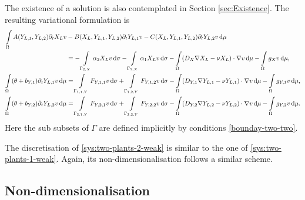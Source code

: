 \documentclass[11pt]{article}
\numberwithin{equation}{section}
\begin{document}
The existence of a solution is also contemplated in Section \ref{sec:Existence}.
The resulting variational formulation is 
\begin{subequations}
\label{sys:two-plants-2-weak}
\begin{align}
    \int\limits_\Omega
    A(Y_{L,1}, Y_{L,2}) \partial_t X_L v &- B(X_L, Y_{L,1}, Y_{L,2}) \partial_t Y_{L,1} v - C(X_L, Y_{L,1}, Y_{L,2}) \partial_t Y_{L,2} v \dif \mu 
    \notag
    \\
    &=
    - \int\limits_{\Gamma_{2,X}}  \alpha_2 X_L v \dif \sigma
    - \int\limits_{\Gamma_{1,X}} \alpha_1 X_L v \dif \sigma
    -\int\limits_\Omega
    (D_X \nabla X_L - \nu X_L) \cdot \nabla v  \dif \mu
    -\int\limits_\Omega g_X v \dif \mu,
    \\
    \int\limits_\Omega (\theta + b_{Y,1}) \partial_t Y_{L,1} v \dif \mu  &=
    \int\limits_{\Gamma_{1,1,Y}} F_{Y,1,1} v \dif\sigma
    + \int\limits_{\Gamma_{1,2,Y}} F_{Y,1,2} v \dif\sigma
    -\int\limits_\Omega (D_{Y,1} \nabla Y_{L,1} - \nu Y_{L,1}) \cdot \nabla v \dif\mu - \int\limits_\Omega g_{Y,1} v \dif\mu,
    \\
    \int\limits_\Omega (\theta + b_{Y,2}) \partial_t Y_{L,2} v \dif\mu  &=
    \int\limits_{\Gamma_{2,1,Y}} F_{Y,2,1} v \dif\sigma
    +\int\limits_{\Gamma_{2,2,Y}} F_{Y,2,2} v \dif\sigma - 
    \int\limits_\Omega (D_{Y,2} \nabla Y_{L,2} - \nu Y_{L,2}) \cdot \nabla v \dif\mu - \int\limits_\Omega g_{Y,2} v \dif\mu.
\end{align}
\end{subequations}
Here the sub subsets of \(\Gamma\) are defined implicitly by conditions \eqref{bounday-two-two}.

The discretisation of \eqref{sys:two-plants-2-weak} is similar to the one of \eqref{sys:two-plants-1-weak}. Again, its non-dimensionalisation follows a similar scheme.








\subsection{Non-dimensionalisation}
\end{document}
